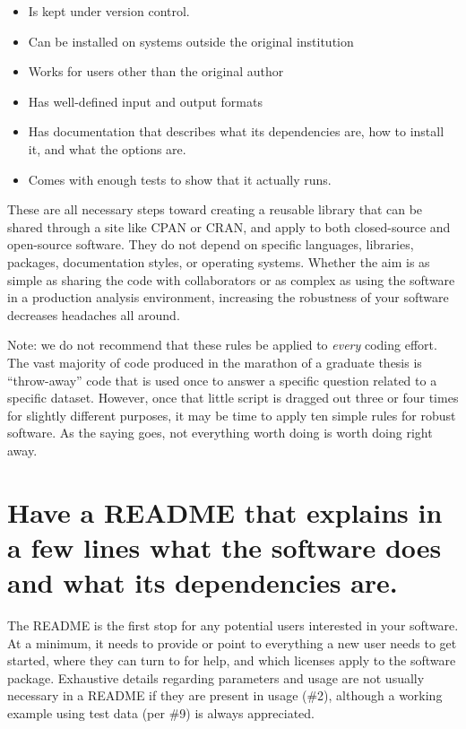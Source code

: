 \documentclass[10pt]{article}
\begin{document}
\begin{itemize}
\item
  Is kept under version control.
\item
  Can be installed on systems outside the original institution
\item
  Works for users other than the original author
\item
  Has well-defined input and output formats
\item
  Has documentation that describes what its dependencies are, how to
  install it, and what the options are.
\item
  Comes with enough tests to show that it actually runs.
\end{itemize}

These are all necessary steps toward creating a reusable library that
can be shared through a site like CPAN or CRAN, and apply to both
closed-source and open-source software. They do not depend on specific
languages, libraries, packages, documentation styles, or operating
systems. Whether the aim is as simple as sharing the code with
collaborators or as complex as using the software in a production
analysis environment, increasing the robustness of your software
decreases headaches all around.

Note: we do not recommend that these rules be applied to \emph{every}
coding effort. The vast majority of code produced in the marathon of a
graduate thesis is ``throw-away'' code that is used once to answer a
specific question related to a specific dataset. However, once that
little script is dragged out three or four times for slightly different
purposes, it may be time to apply ten simple rules for robust software.
As the saying goes, not everything worth doing is worth doing right
away.

\section{Have a README that explains in a few lines what the software does and what its dependencies are.}

The README is the first stop for any potential users interested in your
software. At a minimum, it needs to provide or point to everything a new
user needs to get started, where they can turn to for help, and which
licenses apply to the software package. Exhaustive details regarding
parameters and usage are not usually necessary in a README if they are
present in usage (\#2), although a working example using test data (per
\#9) is always appreciated.
\end{document}
